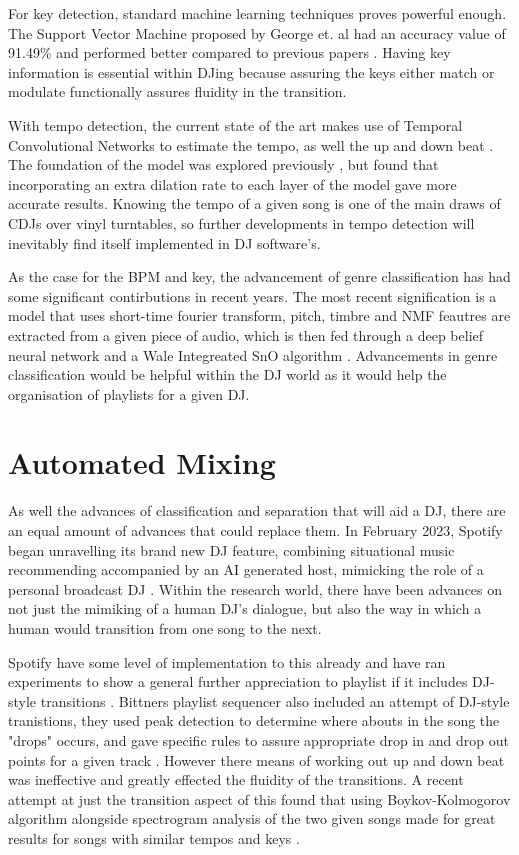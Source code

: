 For key detection, standard machine learning techniques proves powerful enough. The Support Vector Machine proposed by George et. al had an accuracy value of 91.49\% and performed better compared to previous papers \citep{george_development_2022}. Having key information is essential within DJing because assuring the keys either match or modulate functionally assures fluidity in the transition. 

With tempo detection, the current state of the art makes use of Temporal Convolutional Networks to estimate the tempo, as well the up and down beat \citep{bock_deconstruct_2020}. The foundation of the model was explored previously \citep{bock_multi-task_2019}, but found that incorporating an extra dilation rate to each layer of the model gave more accurate results. Knowing the tempo of a given song is one of the main draws of CDJs over vinyl turntables, so further developments in tempo detection will inevitably find itself implemented in DJ software's.

As the case for the BPM and key, the advancement of genre classification has had some significant contirbutions in recent years. The most recent signification is a model that uses short-time fourier transform, pitch, timbre and NMF feautres are extracted from a given piece of audio, which is then fed through a deep belief neural network and a Wale Integreated SnO algorithm \citep{kumaraswamy_optimal_2022}. Advancements in genre classification would be helpful within the DJ world as it would help the organisation of playlists for a given DJ.

\section{Automated Mixing}
As well the advances of classification and separation that will aid a DJ, there are an equal amount of advances that could replace them. In February 2023, Spotify began unravelling its brand new DJ feature, combining situational music recommending accompanied by an AI generated host, mimicking the role of a personal broadcast DJ \citep{naomi_spotify_2023}. Within the research world, there have been advances on not just the mimiking of a human DJ's dialogue, but also the way in which a human would transition from one song to the next.

Spotify have some level of implementation to this already and have ran experiments to show a general further appreciation to playlist if it includes DJ-style transitions \citep{bittner_automatic_2017}. Bittners playlist sequencer also included an attempt of DJ-style tranistions, they used peak detection to determine where abouts in the song the "drops" occurs, and gave specific rules to assure appropriate drop in and drop out points for a given track \citep{bittner_automatic_2017}.  However there means of working out up and down beat was ineffective and greatly effected the fluidity of the transitions. A recent attempt at just the transition aspect of this found that using Boykov-Kolmogorov algorithm alongside spectrogram analysis of the two given songs made for great results for songs with similar tempos and keys \citep{robinson_automated_2023}.

